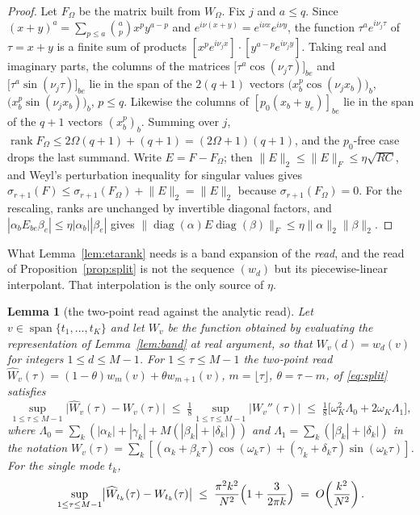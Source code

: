\documentclass[11pt,a4paper]{article}
\theoremstyle{plain}
\newtheorem{lemma}[theorem]{Lemma}
\theoremstyle{definition}
\DeclareMathOperator{\diag}{diag}
\DeclareMathOperator{\rank}{rank}
\begin{document}
\begin{proof}
Let $F_\Omega$ be the matrix built from $W_\Omega$. Fix $j$ and $a\le q$. Since
$(x+y)^{a}=\sum_{p\le a}\binom ap x^{p}y^{a-p}$ and
$e^{i\nu(x+y)}=e^{i\nu x}e^{i\nu y}$, the function
$\tau^{a}e^{i\nu_j\tau}$ of $\tau=x+y$ is a finite sum of products
$[x^{p}e^{i\nu_jx}]\cdot[y^{a-p}e^{i\nu_jy}]$. Taking real and
imaginary parts, the columns of the matrices
$\bigl[\tau^{a}\cos(\nu_j\tau)\bigr]_{be}$ and
$\bigl[\tau^{a}\sin(\nu_j\tau)\bigr]_{be}$ lie in the span of the $2(q+1)$
vectors $\bigl(x_b^{p}\cos(\nu_jx_b)\bigr)_b$,
$\bigl(x_b^{p}\sin(\nu_jx_b)\bigr)_b$, $p\le q$. Likewise the columns of
$[p_0(x_b+y_e)]_{be}$ lie in the span of the $q+1$ vectors $(x_b^{p})_b$.
Summing over $j$, $\rank F_\Omega\le2\Omega(q+1)+(q+1)=(2\Omega+1)(q+1)$, and
the $p_0$-free case drops the last summand. Write $E=F-F_\Omega$; then
$\lVert E\rVert_2\le\lVert E\rVert_F\le\eta\sqrt{RC}$, and Weyl's perturbation
inequality for singular values \cite{Weyl1912} gives
$\sigma_{r+1}(F)\le\sigma_{r+1}(F_\Omega)+\lVert E\rVert_2=\lVert E\rVert_2$
because $\sigma_{r+1}(F_\Omega)=0$. For the rescaling, ranks are unchanged by
invertible diagonal factors, and
$|\alpha_bE_{be}\beta_e|\le\eta|\alpha_b||\beta_e|$ gives
$\lVert\diag(\alpha)E\diag(\beta)\rVert_F
\le\eta\lVert\alpha\rVert_2\lVert\beta\rVert_2$.
\end{proof}

What Lemma~\ref{lem:etarank} needs is a band expansion of the \emph{read}, and
the read of Proposition~\ref{prop:split} is not the sequence $(w_d)$ but its
piecewise-linear interpolant. That interpolation is the only source of $\eta$.

\begin{lemma}[the two-point read against the analytic read]
\label{lem:spline}
Let $v\in\operatorname{span}\{t_1,\dots,t_K\}$ and let $W_v$ be the function
obtained by evaluating the representation of Lemma~\ref{lem:band} at real
argument, so that $W_v(d)=w_d(v)$ for integers $1\le d\le M-1$. For
$1\le\tau\le M-1$ the two-point read
$\widehat W_v(\tau)=(1-\theta)w_{m}(v)+\theta w_{m+1}(v)$,
$m=\lfloor\tau\rfloor$, $\theta=\tau-m$, of \eqref{eq:split} satisfies
\begin{equation}
\label{eq:splinebound}
  \sup_{1\le\tau\le M-1}\bigl|\widehat W_v(\tau)-W_v(\tau)\bigr|
  \;\le\;\tfrac18\sup_{1\le\tau\le M-1}|W_v''(\tau)|
  \;\le\;\tfrac18\bigl[\omega_K^{2}\Lambda_0+2\omega_K\Lambda_1\bigr],
\end{equation}
where $\Lambda_0=\sum_k(|\alpha_k|+|\gamma_k|+M(|\beta_k|+|\delta_k|))$ and
$\Lambda_1=\sum_k(|\beta_k|+|\delta_k|)$ in the notation
$W_v(\tau)=\sum_k[(\alpha_k+\beta_k\tau)\cos(\omega_k\tau)
+(\gamma_k+\delta_k\tau)\sin(\omega_k\tau)]$. For the single mode $t_k$,
\begin{equation}
\label{eq:splinemode}
  \sup_{1\le\tau\le M-1}\bigl|\widehat W_{t_k}(\tau)-W_{t_k}(\tau)\bigr|
  \;\le\;\frac{\pi^{2}k^{2}}{N^{2}}\Bigl(1+\frac3{2\pi k}\Bigr)
  \;=\;O\!\left(\frac{k^{2}}{N^{2}}\right).
\end{equation}
\end{lemma}
\end{document}

